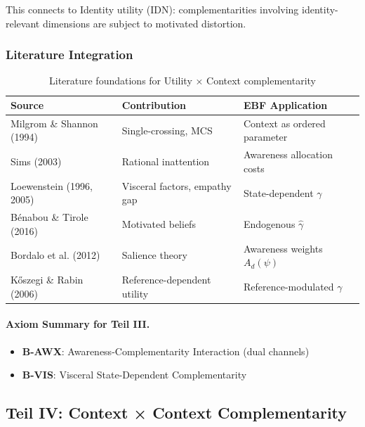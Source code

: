 This connects to Identity utility (IDN): complementarities involving identity-relevant 
dimensions are subject to motivated distortion.

\subsubsection{Literature Integration}

\begin{table}[h]
\centering
\small
\begin{tabular}{p{3.5cm}p{4cm}p{5cm}}
\toprule
\textbf{Source} & \textbf{Contribution} & \textbf{EBF Application} \\
\midrule
Milgrom \& Shannon (1994) & Single-crossing, MCS & Context as ordered parameter \\
Sims (2003) & Rational inattention & Awareness allocation costs \\
Loewenstein (1996, 2005) & Visceral factors, empathy gap & State-dependent $\gamma$ \\
Bénabou \& Tirole (2016) & Motivated beliefs & Endogenous $\hat{\gamma}$ \\
Bordalo et al. (2012) & Salience theory & Awareness weights $A_d(\psi)$ \\
Kőszegi \& Rabin (2006) & Reference-dependent utility & Reference-modulated $\gamma$ \\
\bottomrule
\end{tabular}
\caption{Literature foundations for Utility × Context complementarity}
\label{tab:utility-context-lit}
\end{table}

\paragraph{Axiom Summary for Teil III.}

\begin{itemize}
    \item \textbf{B-AWX}: Awareness-Complementarity Interaction (dual channels)
    \item \textbf{B-VIS}: Visceral State-Dependent Complementarity
\end{itemize}




\subsection{Teil IV: Context × Context Complementarity}
\label{sec:context-context}

